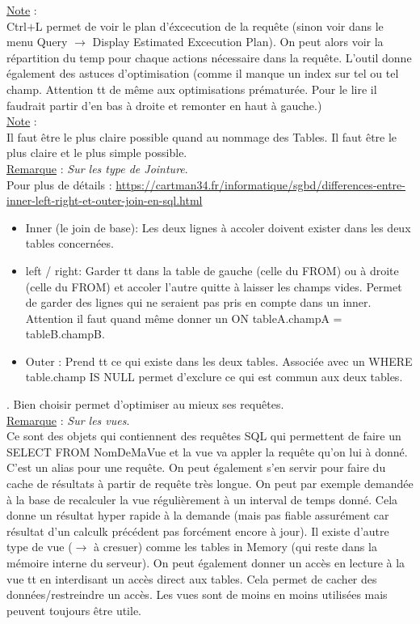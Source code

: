 \documentclass[a4paper,12pt,twoside]{article}
\newcommand{\rem}[2]{\noindent\underline{Remarque} : \textit{#1}.\\ \indent #2}
\newcommand{\note}[1]{\noindent\underline{Note} : \\ \indent #1}
\begin{document}
\note{Ctrl$+$L permet de voir le plan d'éxcecution de la requête (sinon voir dans le menu Query $\to$ Display Estimated Excecution Plan). On peut alors voir la répartition du temp pour chaque actions nécessaire dans la requête. L'outil donne également des astuces d'optimisation (comme il manque un index sur tel ou tel champ. Attention tt de même aux optimisations prématurée. Pour le lire il faudrait partir d'en bas à droite et remonter en haut à gauche.)}\\

\note{Il faut être le plus claire possible quand au nommage des Tables. Il faut être le plus claire et le plus simple possible.}\\

\rem{Sur les type de Jointure}{Pour plus de détails : \url{https://cartman34.fr/informatique/sgbd/differences-entre-inner-left-right-et-outer-join-en-sql.html}
\begin{itemize}
\item Inner (le join de base): Les deux lignes à accoler doivent exister dans les deux tables concernées.
\item left / right: Garder tt dans la table de gauche (celle du FROM) ou à droite (celle du FROM) et accoler l'autre quitte à laisser les champs vides. Permet de garder des lignes qui ne seraient pas pris en compte dans un inner. Attention il faut quand même donner un ON tableA.champA = tableB.champB.
\item Outer : Prend tt ce qui existe dans les deux tables. Associée avec un WHERE table.champ IS NULL permet d'exclure ce qui est commun aux deux tables.  
\end{itemize}. Bien choisir permet d'optimiser au mieux ses requêtes.}\\

\rem{Sur les vues}{Ce sont des objets qui contiennent des requêtes SQL qui permettent de faire un SELECT FROM NomDeMaVue et la vue va appler la requête qu'on lui à donné. C'est un alias pour une requête. On peut également s'en servir pour faire du cache de résultats à partir de requête très longue. On peut par exemple demandée à la base de recalculer la vue régulièrement à un interval de temps donné. Cela donne un résultat hyper rapide à la demande (mais pas fiable assurément car résultat d'un calculk précédent pas forcément encore à jour). Il existe d'autre type de vue ($\to$ à cresuer) comme les tables in Memory (qui reste dans la mémoire interne du serveur). On peut également donner un accès en lecture à la vue tt en interdisant un accès direct aux tables. Cela permet de cacher des données/restreindre un accès. Les vues sont de moins en moins utilisées mais peuvent toujours être utile.}\\



\newpage
\printglossary[type=\acronymtype]%
\glsaddallunused %
\printglossary[type = main,nonumberlist]%
\end{document}
